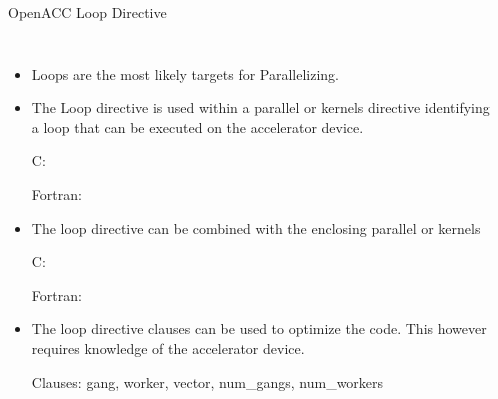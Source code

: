 \documentclass[10pt,t]{beamer}
\begin{document}
\begin{frame}[fragile]{\small OpenACC Loop Directive}
  \begin{columns}
    \begin{itemize}
      \item Loops are the most likely targets for Parallelizing.
      \item The Loop directive is used within a parallel or kernels directive identifying a loop that can be executed on the accelerator device.
      \item[C:] 
      \item[Fortran:] 
      \item The loop directive can be combined with the enclosing parallel or kernels
      \item[C:] 
      \item[Fortran:] 
      \item The loop directive clauses can be used to optimize the code. This however requires knowledge of the accelerator device.
      \item[Clauses:] gang, worker, vector, num\_gangs, num\_workers
    \end{itemize}
    \begin{exampleblock}{}
      
      
    \end{exampleblock}
  \end{columns}
\end{frame}
\end{document}
